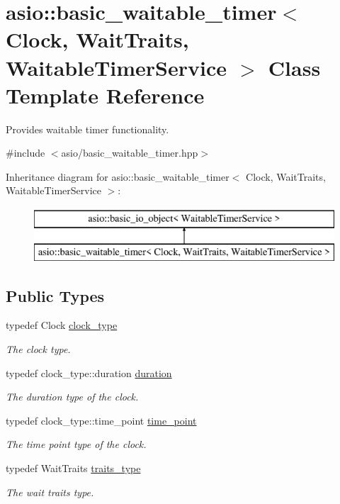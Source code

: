 \hypertarget{classasio_1_1basic__waitable__timer}{}\section{asio\+:\+:basic\+\_\+waitable\+\_\+timer$<$ Clock, Wait\+Traits, Waitable\+Timer\+Service $>$ Class Template Reference}
\label{classasio_1_1basic__waitable__timer}


Provides waitable timer functionality.  




{\ttfamily \#include $<$asio/basic\+\_\+waitable\+\_\+timer.\+hpp$>$}

Inheritance diagram for asio\+:\+:basic\+\_\+waitable\+\_\+timer$<$ Clock, Wait\+Traits, Waitable\+Timer\+Service $>$\+:\begin{figure}[H]
\begin{center}
\leavevmode
\includegraphics[height=2.000000cm]{classasio_1_1basic__waitable__timer}
\end{center}
\end{figure}
\subsection*{Public Types}
\begin{DoxyCompactItemize}
\item 
typedef Clock \hyperlink{classasio_1_1basic__waitable__timer_a1b74d12daabb5d3791f7aa42a7bdbd11}{clock\+\_\+type}
\begin{DoxyCompactList}\small\item\em The clock type. \end{DoxyCompactList}\item 
typedef clock\+\_\+type\+::duration \hyperlink{classasio_1_1basic__waitable__timer_a3ab0ae5bdf928106cd6ea19fcd4f5d49}{duration}
\begin{DoxyCompactList}\small\item\em The duration type of the clock. \end{DoxyCompactList}\item 
typedef clock\+\_\+type\+::time\+\_\+point \hyperlink{classasio_1_1basic__waitable__timer_a6f5aadc1aba86956b544ce107cfb49b0}{time\+\_\+point}
\begin{DoxyCompactList}\small\item\em The time point type of the clock. \end{DoxyCompactList}\item 
typedef Wait\+Traits \hyperlink{classasio_1_1basic__waitable__timer_a8b15c2ab0b8daa7a932ac8bed5fe5540}{traits\+\_\+type}
\begin{DoxyCompactList}\small\item\em The wait traits type. \end{DoxyCompactList}\end{DoxyCompactItemize}
